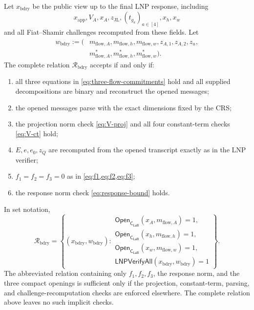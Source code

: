 \documentclass[11pt,a4paper]{article}
\newcommand{\CLaB}{\mathsf{C}_{\mathsf{LaB}}}
\newcommand{\calR}{\mathcal{R}}
\begin{document}
Let \(x_{\mathrm{bdry}}\) be the public view up to the final LNP response,
including
\[
  x_{\mathrm{app}},V_A,x_A,z_{\mathrm{JL}},(t_{g_a})_{a\in[4]},x_h,x_w
\]
and all Fiat--Shamir challenges recomputed from these fields.  Let
\begin{align*}
 w_{\mathrm{bdry}}:=(&m_{\mathrm{flow},A},m_{\mathrm{flow},h},m_{\mathrm{flow},w},
 z_{A,1},z_{A,2},z_u,\\
 &m_{\mathrm{flow},A}^*,m_{\mathrm{flow},h}^*,m_{\mathrm{flow},w}^*).
\end{align*}
The complete relation \(\calR_{\mathrm{bdry}}\) accepts if and only if:
\begin{enumerate}
  \item all three equations in \cref{eq:three-flow-commitments} hold and all
  supplied decompositions are binary and reconstruct the opened messages;
  \item the opened messages parse with the exact dimensions fixed by the CRS;
  \item the projection norm check \cref{eq:V-proj} and all four constant-term
  checks \cref{eq:V-ct} hold;
  \item \(E,e,e_0,z_Q\) are recomputed from the opened transcript exactly as in
  the LNP verifier;
  \item \(f_1=f_2=f_3=0\) as in
  \cref{eq:f1,eq:f2,eq:f3};
  \item the response norm check \cref{eq:response-bound} holds.
\end{enumerate}
In set notation,
\begin{equation}
 \calR_{\mathrm{bdry}}
 =\left\{(x_{\mathrm{bdry}},w_{\mathrm{bdry}}):
 \begin{array}{l}
 \mathsf{Open}_{\CLaB}(x_A,m_{\mathrm{flow},A})=1,\\
 \mathsf{Open}_{\CLaB}(x_h,m_{\mathrm{flow},h})=1,\\
 \mathsf{Open}_{\CLaB}(x_w,m_{\mathrm{flow},w})=1,\\
 \mathsf{LNPVerifyAll}(x_{\mathrm{bdry}},w_{\mathrm{bdry}})=1
 \end{array}
 \right\}.
 \label{eq:boundary-relation}
\end{equation}
The abbreviated relation containing only \(f_1,f_2,f_3\), the response norm,
and the three compact openings is sufficient only if the projection,
constant-term, parsing, and challenge-recomputation checks are enforced
elsewhere.  The complete relation above leaves no such implicit checks.

\end{document}
